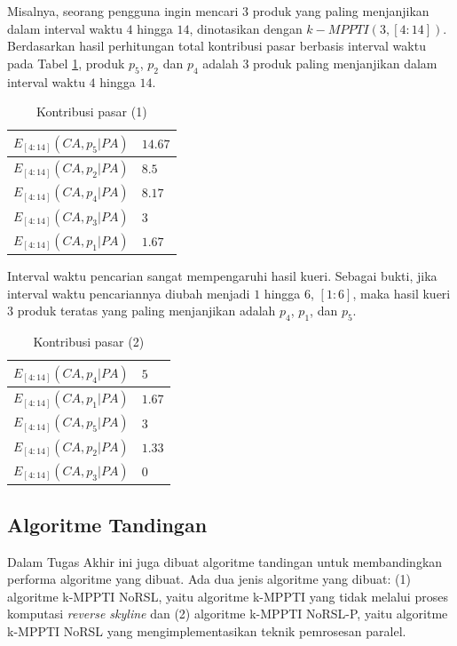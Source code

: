 Misalnya, seorang pengguna ingin mencari $3$ produk yang paling menjanjikan dalam interval waktu $4$ hingga $14$, dinotasikan dengan $k-MPPTI(3, [4:14])$. Berdasarkan hasil perhitungan total kontribusi pasar berbasis interval waktu pada Tabel \ref{tab:mc-ti-res}, produk $p_5$, $p_2$ dan $p_4$ adalah $3$ produk paling menjanjikan dalam interval waktu $4$ hingga $14$.

\begin{table}[H]
	\small
	\centering
	\begin{tabular}{|p{4cm}|p{2cm}|}
		\hline
		$E_{[4:14]}(CA, p_5|PA)$ & $14.67$ \\ \hline
		$E_{[4:14]}(CA, p_2|PA)$ & $8.5$ \\ \hline
		$E_{[4:14]}(CA, p_4|PA)$ & $8.17$ \\ \hline
		$E_{[4:14]}(CA, p_3|PA)$ & $3$ \\ \hline
		$E_{[4:14]}(CA, p_1|PA)$ & $1.67$ \\ \hline
	\end{tabular} 
	\caption{Kontribusi pasar (1)}
	\label{tab:mc-ti-res}
\end{table}

Interval waktu pencarian sangat mempengaruhi hasil kueri. Sebagai bukti, jika interval waktu pencariannya diubah menjadi $1$ hingga $6$, $[1:6]$, maka hasil kueri $3$ produk teratas yang paling menjanjikan adalah $p_4$, $p_1$, dan $p_5$.

\begin{table}[H]
	\small
	\centering
	\begin{tabular}{|p{3cm}|p{2cm}|}
		\hline
		$E_{[4:14]}(CA, p_4|PA)$ & $5$ \\ \hline
		$E_{[4:14]}(CA, p_1|PA)$ & $1.67$ \\ \hline
		$E_{[4:14]}(CA, p_5|PA)$ & $3$ \\ \hline
		$E_{[4:14]}(CA, p_2|PA)$ & $1.33$ \\ \hline
		$E_{[4:14]}(CA, p_3|PA)$ & $0$ \\ \hline
	\end{tabular} 
	\caption{Kontribusi pasar (2)}
	\label{tab:mc-ti-res2}
\end{table}

\subsection{Algoritme Tandingan}
\tab Dalam Tugas Akhir ini juga dibuat algoritme tandingan untuk membandingkan performa algoritme yang dibuat. Ada dua jenis algoritme yang dibuat: (1) algoritme k-MPPTI NoRSL, yaitu algoritme k-MPPTI yang tidak melalui proses komputasi \textit{reverse skyline} dan (2) algoritme k-MPPTI NoRSL-P, yaitu algoritme k-MPPTI NoRSL yang mengimplementasikan teknik pemrosesan paralel.

